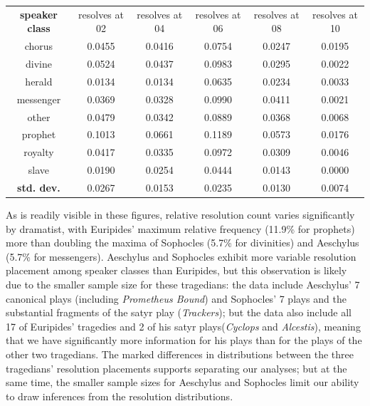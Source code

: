 \documentclass[
]{ceurart}
\begin{document}
\begin{center}
\label{fig:euripides-rel-freq}

\end{center}

\begin{center}
\begin{tabular}{c | c | c | c | c | c} \\
\textbf{speaker class} & resolves at 02 & resolves at 04 & resolves at 06 & resolves at 08 & resolves at 10 \\
chorus & 0.0455 & 0.0416 & 0.0754 & 0.0247 & 0.0195 \\
divine & 0.0524 & 0.0437 & 0.0983 & 0.0295 & 0.0022 \\
herald & 0.0134 & 0.0134 & 0.0635 & 0.0234 & 0.0033 \\
messenger & 0.0369 & 0.0328 & 0.0990 & 0.0411 & 0.0021 \\
other & 0.0479 & 0.0342 & 0.0889 & 0.0368 & 0.0068 \\
prophet & 0.1013 & 0.0661 & 0.1189 & 0.0573 & 0.0176 \\
royalty & 0.0417 & 0.0335 & 0.0972 & 0.0309 & 0.0046 \\
slave & 0.0190 & 0.0254 & 0.0444 & 0.0143 & 0.0000 \\
\textbf{std. dev.} & 0.0267 & 0.0153 & 0.0235 & 0.0130 & 0.0074 \\
\end{tabular}
\end{center}

As is readily visible in these figures, relative resolution count varies
significantly by dramatist, with Euripides' maximum relative frequency
(11.9\% for prophets) more than doubling the maxima of Sophocles (5.7\% for
divinities) and Aeschylus (5.7\% for messengers). Aeschylus and Sophocles
exhibit more variable resolution placement among speaker classes than
Euripides, but this observation is likely due to the smaller sample size for
these tragedians: the data include Aeschylus' 7 canonical plays
(including \textit{Prometheus Bound}) and Sophocles' 7 plays and the
substantial fragments of the satyr play (\textit{Trackers}); but the data
also include all 17 of Euripides' tragedies and 2 of his satyr plays(\textit
{Cyclops} and \textit{Alcestis}), meaning that we have significantly more
information for his plays than for the plays of the other two tragedians. The
marked differences in distributions between the three tragedians' resolution
placements supports separating our analyses; but at the same time, the
smaller sample sizes for Aeschylus and Sophocles limit our ability to draw
inferences from the resolution distributions.
\end{document}
